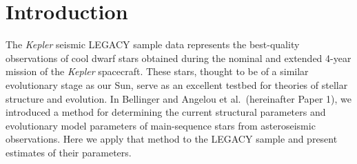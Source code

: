 \documentclass[epj,twocolumn]{webofc}
\begin{document}
\section{Introduction} \label{intro}
%
The \emph{Kepler} seismic LEGACY sample data represents the best-quality observations of cool dwarf stars obtained during the nominal and extended 4-year mission of the \emph{Kepler} spacecraft. These stars, thought to be of a similar evolutionary stage as our Sun, serve as an excellent testbed for theories of stellar structure and evolution. In Bellinger and Angelou et al.~(hereinafter Paper 1), we introduced a method for determining the current structural parameters and evolutionary model parameters of main-sequence stars from asteroseismic observations. Here we apply that method to the LEGACY sample and present estimates of their parameters. 
%
%
\end{document}
